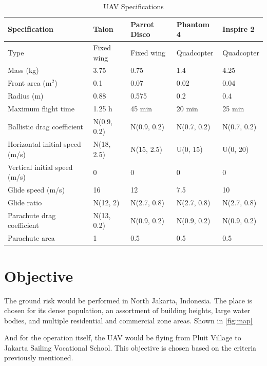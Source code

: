 \documentclass[12pt]{report}
\begin{document}
        \begin{table}[H]
            \centering
            \caption{UAV Specifications}  %
            \begin{tabular}{| l | l | l | l | l |}
                \hline
                \textbf{Specification} & \textbf{Talon} & \textbf{Parrot Disco} & \textbf{Phantom 4} & \textbf{Inspire 2} \\
                \hline
                Type & Fixed wing & Fixed wing & Quadcopter & Quadcopter \\
                Mass (kg) & 3.75 & 0.75 & 1.4 & 4.25 \\
                Front area (m$^2$) & 0.1 & 0.07 & 0.02 & 0.04 \\
                Radius (m) & 0.88 & 0.575 & 0.2 & 0.4 \\
                Maximum flight time & 1.25 h & 45 min & 20 min & 25 min \\
                Ballistic drag coefficient & N(0.9, 0.2) & N(0.9, 0.2) & N(0.7, 0.2) & N(0.7, 0.2) \\
                Horizontal initial speed (m/s) & N(18, 2.5) & N(15, 2.5) & U(0, 15) & U(0, 20) \\
                Vertical initial speed (m/s) & 0 & 0 & 0 & 0 \\
                Glide speed (m/s) & 16 & 12 & 7.5 & 10 \\
                Glide ratio & N(12, 2) & N(2.7, 0.8) & N(2.7, 0.8) & N(2.7, 0.8) \\
                Parachute drag coefficient & N(13, 0.2) & N(0.9, 0.2) & N(0.9, 0.2) & N(0.9, 0.2) \\
                Parachute area & 1 & 0.5 & 0.5 & 0.5 \\
                \hline
            \end{tabular}
        \end{table}

    \section{Objective}
    The ground risk would be performed in North Jakarta, Indonesia. The place is chosen for its dense population, an
    assortment of building heights, large water bodies, and multiple residential and commercial zone areas. Shown in \ref{fig:map}
        
    And for the operation itself, the UAV would be flying from Pluit Village to Jakarta Sailing Vocational School. This
    objective is chosen based on the criteria previously mentioned.
        
\end{document}
